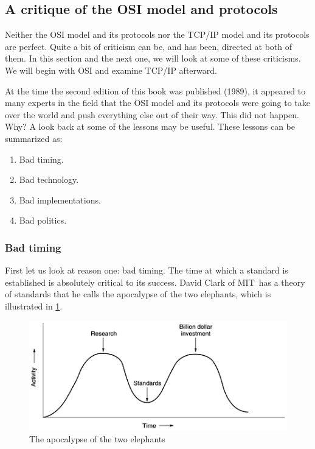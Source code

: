 \subsection{A critique of the OSI model and protocols}

Neither the OSI model and its protocols nor the TCP/IP model and its
protocols are perfect. Quite a bit of criticism can be, and has been,
directed at both of them. In this section and the next one, we will look
at some of these criticisms. We will begin with OSI and examine TCP/IP
afterward.

At the time the second edition of this book was published (1989), it
appeared to many experts in the field that the OSI model and its
protocols were going to take over the world and push everything else out
of their way. This did not happen. Why? A look back at some of the
lessons may be useful. These lessons can be summarized as:

\begin{enumerate}
\item Bad timing.
\item Bad technology.
\item Bad implementations.
\item Bad politics.
\end{enumerate}


\subsubsection{Bad timing}

First let us look at reason one: bad timing. The time at which a standard is established is absolutely critical to its success.
David Clark of MIT\ has a theory of standards that he calls the {apocalypse of the two elephants}, which is illustrated in \cref{fig:two-elephants}.

\begin{figure}
   \centering
   \includegraphics[width=\textwidth]{images/01fig23.png}
   \caption{The apocalypse of the two elephants}
   \label{fig:two-elephants}
\end{figure}


